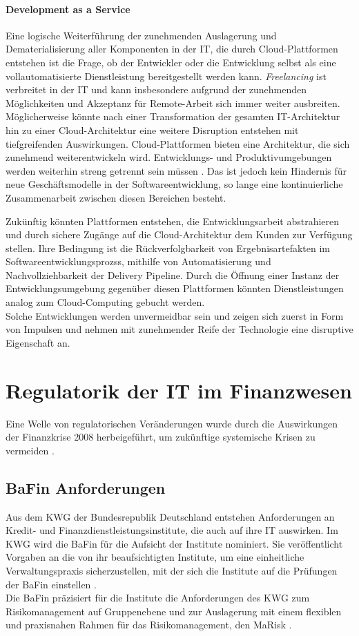\paragraph{Development as a Service}
Eine logische Weiterführung der zunehmenden Auslagerung und Dematerialisierung aller Komponenten in der IT, die durch Cloud-Plattformen entstehen ist die Frage, ob der Entwickler oder die Entwicklung selbst als eine vollautomatisierte Dienstleistung bereitgestellt werden kann. \emph{Freelancing} ist verbreitet in der IT und kann insbesondere aufgrund der zunehmenden Möglichkeiten und Akzeptanz für Remote-Arbeit sich immer weiter ausbreiten. Möglicherweise könnte nach einer Transformation der gesamten IT-Architektur hin zu einer Cloud-Architektur eine weitere Disruption entstehen mit tiefgreifenden Auswirkungen. Cloud-Plattformen bieten eine Architektur, die sich zunehmend weiterentwickeln wird. Entwicklungs- und Produktivumgebungen werden weiterhin streng getrennt sein müssen \cite{MaRisk:2017}. Das ist jedoch kein Hindernis für neue Geschäftsmodelle in der Softwareentwicklung, so lange eine kontinuierliche Zusammenarbeit zwischen diesen Bereichen besteht.

Zukünftig könnten Plattformen entstehen, die Entwicklungsarbeit abstrahieren und durch sichere Zugänge auf die Cloud-Architektur dem Kunden zur Verfügung stellen. Ihre Bedingung ist die Rückverfolgbarkeit von Ergebnisartefakten im Softwareentwicklungsprozss, mithilfe von Automatisierung und Nachvollziehbarkeit der Delivery Pipeline. Durch die Öffnung einer Instanz der Entwicklungsumgebung gegenüber diesen Plattformen könnten Dienstleistungen analog zum Cloud-Computing gebucht werden. 
\medskip
\\
Solche Entwicklungen werden unvermeidbar sein und zeigen sich zuerst in Form von Impulsen \cite{Bussmann2006} und nehmen mit zunehmender Reife der Technologie eine disruptive Eigenschaft an.

\section{Regulatorik der IT im Finanzwesen}
Eine Welle von regulatorischen Veränderungen wurde durch die Auswirkungen der Finanzkrise 2008 herbeigeführt, um zukünftige systemische Krisen zu vermeiden \cite{Gupta:2017}.

\subsection{BaFin Anforderungen}
Aus dem \ac{KWG} der Bundesrepublik Deutschland entstehen Anforderungen an Kredit- und Finanzdienstleistungsinstitute, die auch auf ihre IT auswirken. Im \ac{KWG} wird die BaFin für die Aufsicht der Institute nominiert. Sie veröffentlicht Vorgaben an die von ihr beaufsichtigten Institute, um eine einheitliche Verwaltungspraxis sicherzustellen, mit der sich die Institute auf die Prüfungen der BaFin einstellen \cite{BaFin:Verwaltungspraxis}. 
\medskip
\\
Die BaFin präzisiert für die Institute die Anforderungen des \ac{KWG} zum Risikomanagement auf Gruppenebene und zur Auslagerung mit einem flexiblen und praxisnahen Rahmen für das Risikomanagement, den \ac{MaRisk} \cite{MaRisk:2017}.


